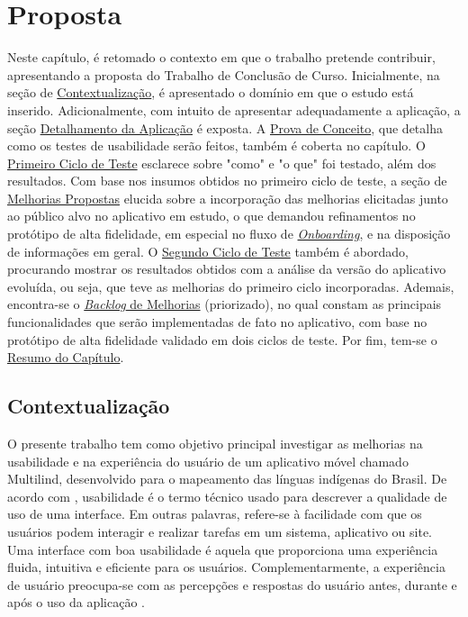 \chapter[Proposta]{Proposta}
\label{chap:Proposta}
Neste capítulo, é retomado o contexto em que o trabalho pretende contribuir, apresentando a proposta do Trabalho de Conclusão de Curso. Inicialmente, na seção de \hyperref[sec:Contextualização]{Contextualização}, é 
apresentado o domínio em que o estudo está inserido. Adicionalmente, com intuito de apresentar adequadamente a aplicação, a seção \hyperref[sec:Detalhamento da Aplicacao]{Detalhamento da Aplicação} é exposta. A \hyperref[sec:Prova de Conceito]{Prova de Conceito}, 
que detalha como os testes de usabilidade serão  feitos, também é coberta no capítulo. O \hyperref[sec:Primeiro Ciclo]{Primeiro Ciclo de Teste} esclarece sobre "como"  e "o que"  foi testado, além dos resultados. Com base nos insumos obtidos no primeiro ciclo de teste, 
a seção de \hyperref[sec:Melhorias Propostas]{Melhorias Propostas} elucida sobre a incorporação das melhorias elicitadas junto ao público alvo no aplicativo em estudo, o que demandou refinamentos no protótipo de alta fidelidade, em especial no fluxo de \hyperref[sec:Onboarding]{\textit{Onboarding}}, 
e na disposição de informações em geral. O \hyperref[sec:Segundo Ciclo]{Segundo Ciclo de Teste} também é abordado, procurando mostrar os resultados obtidos com a análise da versão do aplicativo evoluída, ou seja, que teve as melhorias do primeiro ciclo incorporadas. 
Ademais, encontra-se o \hyperref[sec:Backlog]{\textit{Backlog} de Melhorias} (priorizado), no qual constam as principais funcionalidades que serão implementadas de fato no aplicativo, com base no protótipo de alta fidelidade validado em dois ciclos de teste. 
Por fim, tem-se o \hyperref[sec:Resumo Proposta]{Resumo do Capítulo}.

\section{Contextualização}
\label{sec:Contextualizacao}
O presente trabalho tem como objetivo principal investigar as melhorias na usabilidade e na experiência do usuário de um aplicativo móvel chamado Multilind, desenvolvido para o mapeamento das línguas indígenas do Brasil. 
De acordo com , usabilidade é o termo técnico usado para descrever a qualidade de uso de uma interface. Em outras palavras, refere-se à facilidade com que os usuários podem interagir e realizar 
tarefas em um sistema, aplicativo ou site. Uma interface com boa usabilidade é aquela que proporciona uma experiência fluida, intuitiva e eficiente para os usuários. Complementarmente, a experiência de usuário preocupa-se 
com as percepções e respostas do usuário antes, durante e após o uso da aplicação \cite{iso9241210}.


